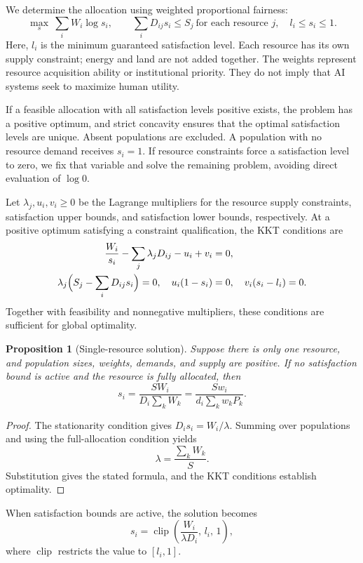 \documentclass[12pt,a4paper]{article}
\newtheorem{proposition}{Proposition}[section]
\theoremstyle{remark}
\begin{document}
We determine the allocation using weighted proportional fairness:
\begin{equation}\label{eq:alloc}
\max_s\ \sum_iW_i\log s_i,\qquad
\sum_iD_{ij}s_i\le S_j\ \text{for each resource }j,\quad l_i\le s_i\le1.
\end{equation}
Here, $l_i$ is the minimum guaranteed satisfaction level. Each resource has its own supply constraint; energy and land are not added together. The weights represent resource acquisition ability or institutional priority. They do not imply that AI systems seek to maximize human utility.

If a feasible allocation with all satisfaction levels positive exists, the problem has a positive optimum, and strict concavity ensures that the optimal satisfaction levels are unique. Absent populations are excluded. A population with no resource demand receives $s_i=1$. If resource constraints force a satisfaction level to zero, we fix that variable and solve the remaining problem, avoiding direct evaluation of $\log0$.

Let $\lambda_j,u_i,v_i\ge0$ be the Lagrange multipliers for the resource supply constraints, satisfaction upper bounds, and satisfaction lower bounds, respectively. At a positive optimum satisfying a constraint qualification, the KKT conditions are
\begin{align}
\frac{W_i}{s_i}-\sum_j\lambda_jD_{ij}-u_i+v_i&=0,\label{eq:kkt}\\
\lambda_j\Bigl(S_j-\sum_iD_{ij}s_i\Bigr)=0,\quad
u_i(1-s_i)&=0,\quad v_i(s_i-l_i)=0.\nonumber
\end{align}
Together with feasibility and nonnegative multipliers, these conditions are sufficient for global optimality.

\begin{proposition}[Single-resource solution]\label{prop:single}
Suppose there is only one resource, and population sizes, weights, demands, and supply are positive. If no satisfaction bound is active and the resource is fully allocated, then
\begin{equation}\label{eq:single}
s_i=\frac{SW_i}{D_i\sum_kW_k}
=\frac{Sw_i}{d_i\sum_kw_kP_k}.
\end{equation}
\end{proposition}
\begin{proof}
The stationarity condition gives $D_is_i=W_i/\lambda$. Summing over populations and using the full-allocation condition yields
\[
\lambda=\frac{\sum_kW_k}{S}.
\]
Substitution gives the stated formula, and the KKT conditions establish optimality.
\end{proof}
When satisfaction bounds are active, the solution becomes
\[
s_i=\operatorname{clip}\left(\frac{W_i}{\lambda D_i},\,l_i,\,1\right),
\]
where $\operatorname{clip}$ restricts the value to $[l_i,1]$.
\end{document}
